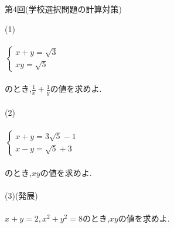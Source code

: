 \documentclass{jarticle}
\begin{document}
\begin{center}
第4回(学校選択問題の計算対策)
\end{center}
(1)
\\
\\
$
\begin{cases}
x+y=\sqrt{3} \\
xy=\sqrt{5}  
\end{cases}
$
\\
\\
のとき,\large{$\frac{1}{x}+\frac{1}{y}$}の値を求めよ.
\\
\\
(2)
\\
\\
$
\begin{cases}
x+y=3\sqrt{5}-1 \\
x-y=\sqrt{5}+3
\end{cases}
$
\\
\\
のとき,$xy$の値を求めよ.
\\
\\
(3)(発展)
\\
\\
$x+y=2,x^2+y^2=8$のとき,$xy$の値を求めよ.
\end{document}
